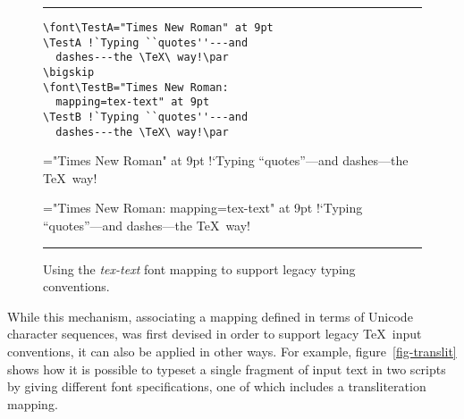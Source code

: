 \documentclass[letterpaper,11pt]{article}
\begin{document}
\begin{figure}[tb]
\hrule\smallskip
\begin{minipage}{0.6\hsize}
\begin{verbatim}
\font\TestA="Times New Roman" at 9pt
\TestA !`Typing ``quotes''---and
  dashes---the \TeX\ way!\par
\bigskip
\font\TestB="Times New Roman:
  mapping=tex-text" at 9pt
\TestB !`Typing ``quotes''---and
  dashes---the \TeX\ way!\par
\end{verbatim}
\end{minipage}\hfil
\begin{minipage}{0.4\hsize}
\font\TestA="Times New Roman" at 9pt
\TestA !`Typing ``quotes''---and
  dashes---the \TeX\ way!\par
\bigskip
\font\TestB="Times New Roman:
  mapping=tex-text" at 9pt
\TestB !`Typing ``quotes''---and
  dashes---the \TeX\ way!\par
\end{minipage}
\smallskip\hrule
\caption{Using the {\em tex-text} font mapping to support legacy typing conventions.}
\label{fig-mapping}
\end{figure}

While this mechanism, associating a mapping defined in terms of Unicode character sequences, was first devised in order to support legacy \TeX\ input conventions, it can also be applied in other ways. For example, figure~\ref{fig-translit} shows how it is possible to typeset a single fragment of input text in two scripts by giving different font specifications, one of which includes a transliteration mapping.
\end{document}
